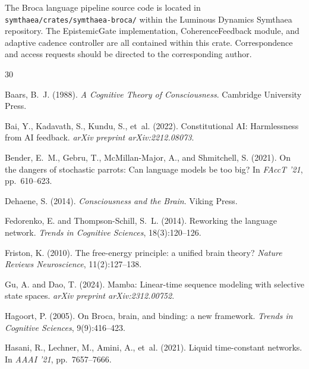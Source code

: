 \documentclass[12pt,a4paper]{article}
\begin{document}
The Broca language pipeline source code is located in \texttt{symthaea/crates/symthaea-broca/} within the Luminous Dynamics Symthaea repository. The EpistemicGate implementation, CoherenceFeedback module, and adaptive cadence controller are all contained within this crate. Correspondence and access requests should be directed to the corresponding author.


\begin{thebibliography}{30}

Baars, B.~J. (1988).
\newblock \emph{A Cognitive Theory of Consciousness}.
\newblock Cambridge University Press.

Bai, Y., Kadavath, S., Kundu, S., et~al. (2022).
\newblock Constitutional AI: Harmlessness from AI feedback.
\newblock \emph{arXiv preprint arXiv:2212.08073}.

Bender, E.~M., Gebru, T., McMillan-Major, A., and Shmitchell, S. (2021).
\newblock On the dangers of stochastic parrots: Can language models be too big?
\newblock In \emph{FAccT '21}, pp.\ 610--623.

Dehaene, S. (2014).
\newblock \emph{Consciousness and the Brain}.
\newblock Viking Press.

Fedorenko, E. and Thompson-Schill, S.~L. (2014).
\newblock Reworking the language network.
\newblock \emph{Trends in Cognitive Sciences}, 18(3):120--126.

Friston, K. (2010).
\newblock The free-energy principle: a unified brain theory?
\newblock \emph{Nature Reviews Neuroscience}, 11(2):127--138.

Gu, A. and Dao, T. (2024).
\newblock Mamba: Linear-time sequence modeling with selective state spaces.
\newblock \emph{arXiv preprint arXiv:2312.00752}.

Hagoort, P. (2005).
\newblock On Broca, brain, and binding: a new framework.
\newblock \emph{Trends in Cognitive Sciences}, 9(9):416--423.

Hasani, R., Lechner, M., Amini, A., et~al. (2021).
\newblock Liquid time-constant networks.
\newblock In \emph{AAAI '21}, pp.\ 7657--7666.


\end{thebibliography}
\end{document}
